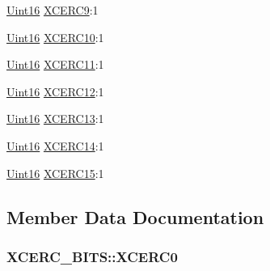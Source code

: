 \begin{DoxyCompactItemize}
\item 
\hyperlink{_d_s_p2833x___device_8h_a59a9f6be4562c327cbfb4f7e8e18f08b}{Uint16} \hyperlink{struct_x_c_e_r_c___b_i_t_s_a29ff06c81325b71ae8100408aa4092a8}{X\+C\+E\+R\+C9}\+:1
\item 
\hyperlink{_d_s_p2833x___device_8h_a59a9f6be4562c327cbfb4f7e8e18f08b}{Uint16} \hyperlink{struct_x_c_e_r_c___b_i_t_s_ab1dbcbfaf9e8c0148617395f10e547d0}{X\+C\+E\+R\+C10}\+:1
\item 
\hyperlink{_d_s_p2833x___device_8h_a59a9f6be4562c327cbfb4f7e8e18f08b}{Uint16} \hyperlink{struct_x_c_e_r_c___b_i_t_s_a74ae4e133001493c4a5ebc6b42fe07f6}{X\+C\+E\+R\+C11}\+:1
\item 
\hyperlink{_d_s_p2833x___device_8h_a59a9f6be4562c327cbfb4f7e8e18f08b}{Uint16} \hyperlink{struct_x_c_e_r_c___b_i_t_s_ad81d504e7f9875b37013945e6b3fb758}{X\+C\+E\+R\+C12}\+:1
\item 
\hyperlink{_d_s_p2833x___device_8h_a59a9f6be4562c327cbfb4f7e8e18f08b}{Uint16} \hyperlink{struct_x_c_e_r_c___b_i_t_s_ad22caa9c2fcb8601ef8bb965dd90a4cb}{X\+C\+E\+R\+C13}\+:1
\item 
\hyperlink{_d_s_p2833x___device_8h_a59a9f6be4562c327cbfb4f7e8e18f08b}{Uint16} \hyperlink{struct_x_c_e_r_c___b_i_t_s_a184056069295bc80a400b3261d17a45c}{X\+C\+E\+R\+C14}\+:1
\item 
\hyperlink{_d_s_p2833x___device_8h_a59a9f6be4562c327cbfb4f7e8e18f08b}{Uint16} \hyperlink{struct_x_c_e_r_c___b_i_t_s_aae7f92c03b9ee0a8ee52e62f0e750511}{X\+C\+E\+R\+C15}\+:1
\end{DoxyCompactItemize}


\subsection{Member Data Documentation}
\hypertarget{struct_x_c_e_r_c___b_i_t_s_a5e56b471be0cde43bf806f965b86e54a}{}
\subsubsection[{X\+C\+E\+R\+C0}]{ X\+C\+E\+R\+C\+\_\+\+B\+I\+T\+S\+::\+X\+C\+E\+R\+C0}\label{struct_x_c_e_r_c___b_i_t_s_a5e56b471be0cde43bf806f965b86e54a}
\hypertarget{struct_x_c_e_r_c___b_i_t_s_ac5a5a49fae1c4693a0152ac97938ee9c}{}
